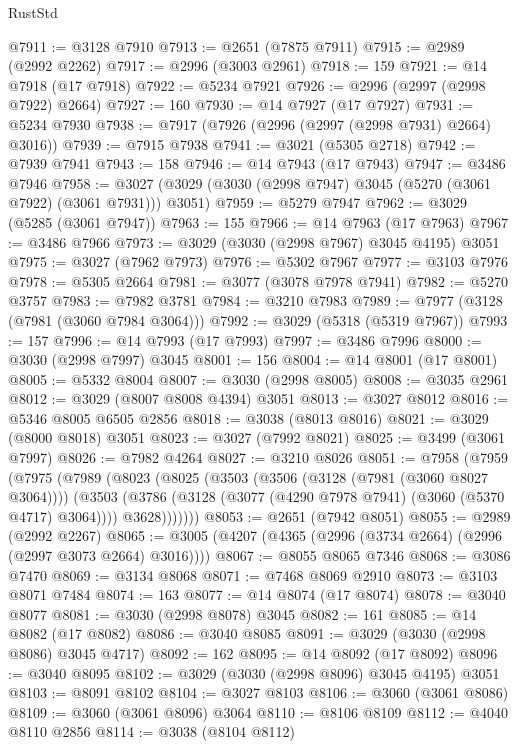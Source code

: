 \begin{lexlean}{RustStd}
\begin{coremodule}
@7911 := @3128 @7910
@7913 := @2651 (@7875 @7911)
@7915 := @2989 (@2992 @2262)
@7917 := @2996 (@3003 @2961)
@7918 := 159
@7921 := @14 @7918 (@17 @7918)
@7922 := @5234 @7921
@7926 := @2996 (@2997 (@2998 @7922) @2664)
@7927 := 160
@7930 := @14 @7927 (@17 @7927)
@7931 := @5234 @7930
@7938 := @7917 (@7926 (@2996 (@2997 (@2998 @7931) @2664) @3016))
@7939 := @7915 @7938
@7941 := @3021 (@5305 @2718)
@7942 := @7939 @7941
@7943 := 158
@7946 := @14 @7943 (@17 @7943)
@7947 := @3486 @7946
@7958 := @3027 (@3029 (@3030 (@2998 @7947) @3045 (@5270 (@3061 @7922) (@3061 @7931))) @3051)
@7959 := @5279 @7947
@7962 := @3029 (@5285 (@3061 @7947))
@7963 := 155
@7966 := @14 @7963 (@17 @7963)
@7967 := @3486 @7966
@7973 := @3029 (@3030 (@2998 @7967) @3045 @4195) @3051
@7975 := @3027 (@7962 @7973)
@7976 := @5302 @7967
@7977 := @3103 @7976
@7978 := @5305 @2664
@7981 := @3077 (@3078 @7978 @7941)
@7982 := @5270 @3757
@7983 := @7982 @3781
@7984 := @3210 @7983
@7989 := @7977 (@3128 (@7981 (@3060 @7984 @3064)))
@7992 := @3029 (@5318 (@5319 @7967))
@7993 := 157
@7996 := @14 @7993 (@17 @7993)
@7997 := @3486 @7996
@8000 := @3030 (@2998 @7997) @3045
@8001 := 156
@8004 := @14 @8001 (@17 @8001)
@8005 := @5332 @8004
@8007 := @3030 (@2998 @8005)
@8008 := @3035 @2961
@8012 := @3029 (@8007 @8008 @4394) @3051
@8013 := @3027 @8012
@8016 := @5346 @8005 @6505 @2856
@8018 := @3038 (@8013 @8016)
@8021 := @3029 (@8000 @8018) @3051
@8023 := @3027 (@7992 @8021)
@8025 := @3499 (@3061 @7997)
@8026 := @7982 @4264
@8027 := @3210 @8026
@8051 := @7958
    (@7959
      (@7975
        (@7989
          (@8023
            (@8025
              (@3503
                (@3506 (@3128 (@7981 (@3060 @8027 @3064))))
                (@3503
                  (@3786 (@3128 (@3077 (@4290 @7978 @7941) (@3060 (@5370 @4717) @3064))))
                  @3628)))))))
@8053 := @2651 (@7942 @8051)
@8055 := @2989 (@2992 @2267)
@8065 := @3005 (@4207 (@4365 (@2996 (@3734 @2664) (@2996 (@2997 @3073 @2664) @3016))))
@8067 := @8055 @8065 @7346
@8068 := @3086 @7470
@8069 := @3134 @8068
@8071 := @7468 @8069 @2910
@8073 := @3103 @8071 @7484
@8074 := 163
@8077 := @14 @8074 (@17 @8074)
@8078 := @3040 @8077
@8081 := @3030 (@2998 @8078) @3045
@8082 := 161
@8085 := @14 @8082 (@17 @8082)
@8086 := @3040 @8085
@8091 := @3029 (@3030 (@2998 @8086) @3045 @4717)
@8092 := 162
@8095 := @14 @8092 (@17 @8092)
@8096 := @3040 @8095
@8102 := @3029 (@3030 (@2998 @8096) @3045 @4195) @3051
@8103 := @8091 @8102
@8104 := @3027 @8103
@8106 := @3060 (@3061 @8086)
@8109 := @3060 (@3061 @8096) @3064
@8110 := @8106 @8109
@8112 := @4040 @8110 @2856
@8114 := @3038 (@8104 @8112)

\end{coremodule}
\end{lexlean}
